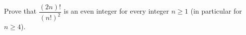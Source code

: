 Prove that $\dfrac{(2n)!}{(n!)^2}$ is an even integer for every integer $n\ge1$ (in particular for $n\ge4$).
